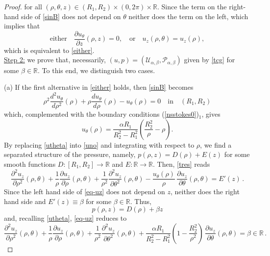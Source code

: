 \documentclass[10pt,a4paper]{amsart}
\def\P{{\mathcal P}}
\newcommand{\R}{\mathbb{R}}
\def\U{{\mathcal U}}
\def\eq#1{(\ref{#1})}
\begin{document}
\begin{proof}
		for all $(\rho, \theta, z)\in (R_1,R_2)\times (0, 2\pi)\times \mathbb{R}$. Since the term on the right-hand side of \eqref{sinB} does not depend on $\theta$ neither does the term on the left, which implies that
		$$
		\text{either}\quad \frac{\partial u_{\theta}}{\partial z}(\rho,z)=0,\quad \text{or}\quad u_z(\rho,\theta)=u_z(\rho),
		$$
		which is equivalent to \eqref{either}.\\
		\underline{Step 2:} we prove that, necessarily, $(u,p)=(\U_{\alpha,\beta}, \P_{\alpha,\beta})$ given by \eqref{tcg}
		for some $\beta\in\R$. To this end, we distinguish two cases.\par
		(a) If the first alternative in \eqref{either} holds, then \eqref{sinB} becomes
		$$
		\rho^2\frac{d^2 u_{\theta}}{d\rho^2}(\rho)+\rho\frac{du_{\theta}}{d\rho}(\rho)-u_\theta(\rho)=0\quad\text{in}\quad (R_1,R_2)
		$$
		which, complemented with the boundary conditions \eq{nsstokes0}$_1$, gives
		\begin{equation}\label{utheta}
			u_\theta(\rho)=\frac{\alpha R_1}{R_2^2 -R_1^2} \left(\frac{R_2^2}{\rho}-\rho\right) .
		\end{equation}
		By replacing \eqref{utheta} into \eqref{uno} and integrating with respect to $\rho$, we find a separated structure of the pressure, namely,
		$
		p(\rho, z)=D(\rho)+E(z)
		$
		for some smooth functions $D:[R_1,R_2]\to\R$ and $E:\R\to\R$. Then, \eqref{tres} reads
		\begin{equation}\label{eq-uz}
			\frac{\partial^2 u_z}{\partial\rho^2}(\rho,\theta)+\frac{1}{\rho}\frac{\partial u_z}{\partial\rho}(\rho,\theta)+\frac{1}{\rho^2}\frac{\partial^2 u_z}{\partial\theta^2}(\rho,\theta)-\frac{u_\theta(\rho)}{\rho}\, \frac{\partial u_z}{\partial\theta}(\rho,\theta)=E'(z)\, .
		\end{equation}
		Since the left hand side of \eqref{eq-uz} does not depend on $z$, neither does the right hand side and $E'(z)\equiv\beta$ for some $\beta\in\R$.
		Thus,
		\begin{equation}\label{sepa-pres}
			p(\rho,z)=D(\rho)+\beta z
		\end{equation}and,
		recalling \eqref{utheta}, \eqref{eq-uz} reduces to
		\begin{equation}\label{F}
			\frac{\partial^2 u_z}{\partial\rho^2}(\rho,\theta)+\frac{1}{\rho}\frac{\partial u_z}{\partial\rho}(\rho,\theta)+
			\frac{1}{\rho^2}\frac{\partial^2 u_z}{\partial\theta^2}(\rho,\theta)+
			\frac{\alpha R_1 }{R_2^2 -R_1^2} \left(1-\frac{R_2^2}{\rho^2}\right)\, \frac{\partial u_z}{\partial\theta}(\rho,\theta)=\beta\in\R\, .

\end{equation}
\end{proof}
\end{document}
